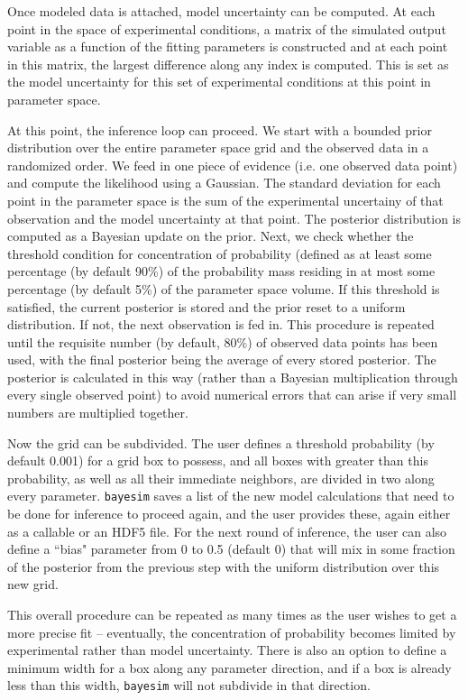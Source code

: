 \documentclass[aps,prl,amsmath,amssymb,superscriptaddress,notitlepage,groupedaddress]{revtex4-1}
\begin{document}
   Once modeled data is attached, model uncertainty can be computed. At each point in the space of experimental conditions, a matrix of the simulated output variable as a function of the fitting parameters is constructed and at each point in this matrix, the largest difference along any index is computed. This is set as the model uncertainty for this set of experimental conditions at this point in parameter space.

  At this point, the inference loop can proceed. We start with a bounded prior distribution over the entire parameter space grid and the observed data in a randomized order. We feed in one piece of evidence (i.e. one observed data point) and compute the likelihood using a Gaussian. The standard deviation for each point in the parameter space is the sum of the experimental uncertainy of that observation and the model uncertainty at that point. The posterior distribution is computed as a Bayesian update on the prior. Next, we check whether the threshold condition for concentration of probability (defined as at least some percentage (by default 90\%) of the probability mass residing in at most some percentage (by default 5\%) of the parameter space volume. If this threshold is satisfied, the current posterior is stored and the prior reset to a uniform distribution. If not, the next observation is fed in. This procedure is repeated until the requisite number (by default, 80\%) of observed data points has been used, with the final posterior being the average of every stored posterior. The posterior is calculated in this way (rather than a Bayesian multiplication through every single observed point) to avoid numerical errors that can arise if very small numbers are multiplied together.

  Now the grid can be subdivided. The user defines a threshold probability (by default 0.001) for a grid box to possess, and all boxes with greater than this probability, as well as all their immediate neighbors, are divided in two along every parameter. \texttt{bayesim} saves a list of the new model calculations that need to be done for inference to proceed again, and the user provides these, again either as a callable or an HDF5 file. For the next round of inference, the user can also define a ``bias" parameter from 0 to 0.5 (default 0) that will mix in some fraction of the posterior from the previous step with the uniform distribution over this new grid.

  This overall procedure can be repeated as many times as the user wishes to get a more precise fit -- eventually, the concentration of probability becomes limited by experimental rather than model uncertainty. There is also an option to define a minimum width for a box along any parameter direction, and if a box is already less than this width, \texttt{bayesim} will not subdivide in that direction.
\end{document}
